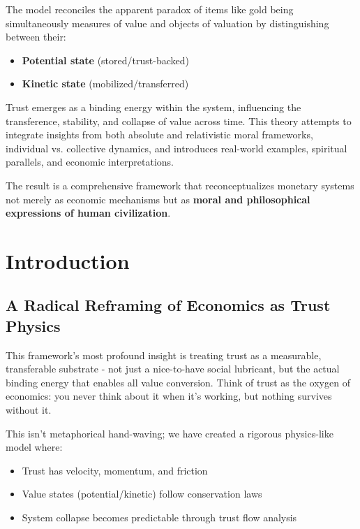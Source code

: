 \documentclass[11pt,oneside]{book}
\begin{document}
The model reconciles the apparent paradox of items like gold being simultaneously measures of value and objects of valuation by distinguishing between their:
\begin{itemize}
\item \textbf{Potential state} (stored/trust-backed)
\item \textbf{Kinetic state} (mobilized/transferred)
\end{itemize}

Trust emerges as a binding energy within the system, influencing the transference, stability, and collapse of value across time. This theory attempts to integrate insights from both absolute and relativistic moral frameworks, individual vs. collective dynamics, and introduces real-world examples, spiritual parallels, and economic interpretations. 

The result is a comprehensive framework that reconceptualizes monetary systems not merely as economic mechanisms but as \textbf{moral and philosophical expressions of human civilization}.



\chapter*{Introduction}


\section*{A Radical Reframing of Economics as Trust Physics}

This framework's most profound insight is treating trust as a measurable, transferable substrate - not just a nice-to-have social lubricant, but the actual binding energy that enables all value conversion. Think of trust as the oxygen of economics: you never think about it when it's working, but nothing survives without it.

This isn't metaphorical hand-waving; we have created a rigorous physics-like model where:

\begin{itemize}
\item Trust has velocity, momentum, and friction
\item Value states (potential/kinetic) follow conservation laws
\item System collapse becomes predictable through trust flow analysis
\end{itemize}
\end{document}
